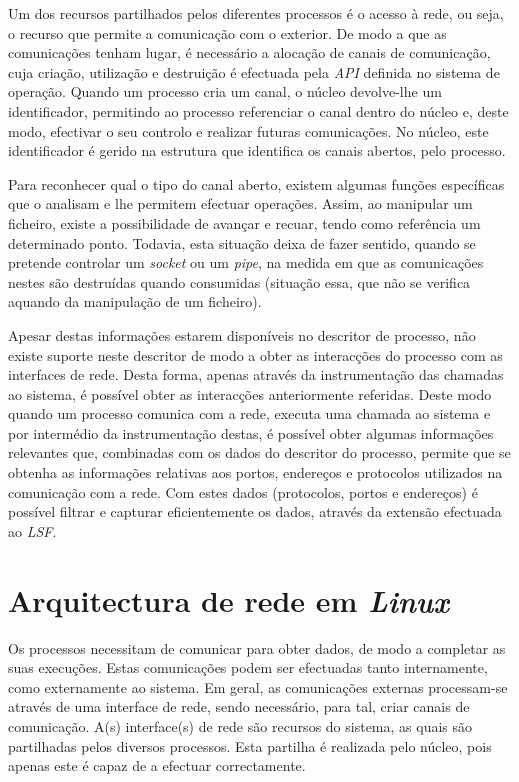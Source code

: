 Um dos recursos partilhados pelos diferentes processos é o acesso à rede, ou seja, o recurso que permite a comunicação com o exterior.
De modo a que as comunicações tenham lugar, é necessário a alocação de canais de comunicação, cuja criação, utilização e destruição é efectuada pela \textit{API} definida no sistema de operação.
Quando um processo cria um canal, o núcleo devolve-lhe um identificador, permitindo ao processo referenciar o canal dentro do núcleo e, deste modo, efectivar o seu controlo e realizar futuras comunicações.
No núcleo, este identificador é gerido na estrutura que identifica os canais abertos, pelo processo.

Para reconhecer qual o tipo do canal aberto, existem algumas funções específicas que o analisam e lhe permitem efectuar operações.
Assim, ao manipular um ficheiro, existe a possibilidade de avançar e recuar, tendo como referência um determinado ponto.
Todavia, esta situação deixa de fazer sentido, quando se pretende controlar um \textit{socket} ou um \textit{pipe}, na medida em que as comunicações nestes são destruídas quando consumidas (situação essa, que não se verifica aquando da manipulação de um ficheiro).

Apesar destas informações estarem disponíveis no descritor de processo, não existe suporte neste descritor de modo a obter as interacções do processo com as interfaces de rede.
Desta forma, apenas através da instrumentação das chamadas ao sistema, é possível obter as interacções anteriormente referidas.
Deste modo quando um processo comunica com a rede, executa uma chamada ao sistema e por intermédio da instrumentação destas, é possível obter algumas informações relevantes que, combinadas com os dados do descritor do processo, permite que se obtenha as informações relativas aos portos, endereços e protocolos utilizados na comunicação com a rede.
Com estes dados (protocolos, portos e endereços) é possível filtrar e capturar eficientemente os dados, através da extensão efectuada ao \textit{LSF}.

\section{Arquitectura de rede em \textit{Linux}}
\label{sub:network}

Os processos necessitam de comunicar para obter dados, de modo a completar as suas execuções.
Estas comunicações podem ser efectuadas tanto internamente, como externamente ao sistema.
Em geral, as comunicações externas processam-se através de uma interface de rede, sendo necessário, para tal, criar canais de comunicação.
A(s) interface(s) de rede são recursos do sistema, as quais são partilhadas pelos diversos processos.
Esta partilha é realizada pelo núcleo, pois apenas este é capaz de a efectuar correctamente.

